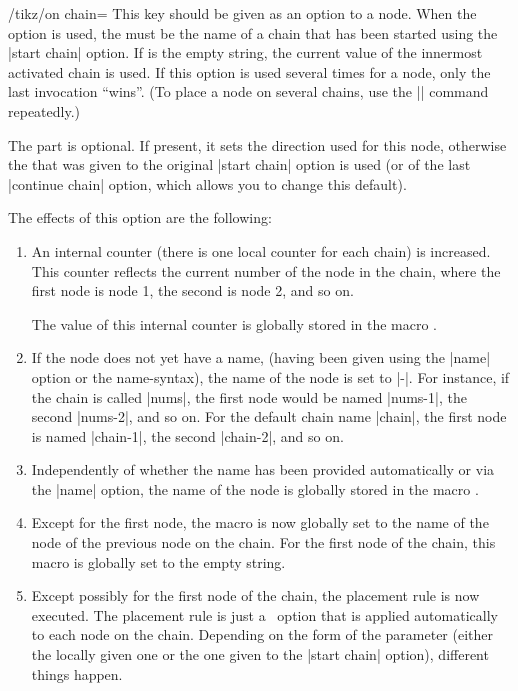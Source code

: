 \begin{key}{/tikz/on chain=}
    This key should be given as an option to a node. When the option is used,
    the  must be the name of a chain that has been started
    using the |start chain| option. If  is the empty string,
    the current value of the innermost activated chain is used. If this option
    is used several times for a node, only the last invocation ``wins''. (To
    place a node on several chains, use the |\chainin| command repeatedly.)

    The  part is optional. If present, it sets the direction
    used for this node, otherwise the  that was given to the
    original |start chain| option is used (or of the last |continue chain|
    option, which allows you to change this default).

    The effects of this option are the following:
    \begin{enumerate}
        \item An internal counter (there is one local counter for each chain)
            is increased. This counter reflects the current number of the node
            in the chain, where the first node is node 1, the second is node 2,
            and so on.

            The value of this internal counter is globally stored in the macro
            .
        \item If the node does not yet have a name, (having been given using
            the |name| option or the name-syntax), the name of the node is set
            to |-|.
            For instance, if the chain is called |nums|, the first node would
            be named |nums-1|, the second |nums-2|, and so on. For the default
            chain name |chain|, the first node is named |chain-1|, the second
            |chain-2|, and so on.
        \item Independently of whether the name has been provided automatically
            or via the |name| option, the name of the node is globally stored
            in the macro .
        \item Except for the first node, the macro
             is now globally set to the name of
            the node of the previous node on the chain. For the first node of
            the chain, this macro is globally set to the empty string.
        \item Except possibly for the first node of the chain, the placement
            rule is now executed. The placement rule is just a \tikzname\
            option that is applied automatically to each node on the chain.
            Depending on the form of the \meta{direction} parameter (either the
            locally given one or the one given to the |start chain| option),
            different things happen.


\end{enumerate}
\end{key}
